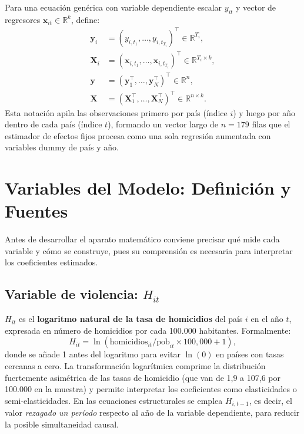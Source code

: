 \documentclass[12pt, a4paper]{article}
\theoremstyle{definition}
\newcommand{\R}{\mathbb{R}}
\begin{document}
Para una ecuación genérica con variable dependiente escalar $y_{it}$ y vector de regresores $\bm{x}_{it} \in \R^k$, define:
\begin{align*}
  \bm{y}_i &= (y_{i,t_1}, \ldots, y_{i,t_{T_i}})^\top \in \R^{T_i}, \\
  \bm{X}_i &= (\bm{x}_{i,t_1}, \ldots, \bm{x}_{i,t_{T_i}})^\top \in \R^{T_i \times k}, \\
  \bm{y}   &= (\bm{y}_1^\top, \ldots, \bm{y}_N^\top)^\top \in \R^n, \\
  \bm{X}   &= (\bm{X}_1^\top, \ldots, \bm{X}_N^\top)^\top \in \R^{n \times k}.
\end{align*}
Esta notación apila las observaciones primero por país (índice $i$) y luego por año dentro de cada país (índice $t$), formando un vector largo de $n = 179$ filas que el estimador de efectos fijos procesa como una sola regresión aumentada con variables dummy de país y año.

\section{Variables del Modelo: Definición y Fuentes}
\label{sec:variables}

Antes de desarrollar el aparato matemático conviene precisar qué mide cada variable y cómo se construye, pues su comprensión es necesaria para interpretar los coeficientes estimados.

\subsection{Variable de violencia: $H_{it}$}

$H_{it}$ es el \textbf{logaritmo natural de la tasa de homicidios} del país $i$ en el año $t$, expresada en número de homicidios por cada 100.000 habitantes. Formalmente:
\[
  H_{it} = \ln\!\left(\text{homicidios}_{it} / \text{pob}_{it} \times 100{,}000 + 1\right),
\]
donde se añade 1 antes del logaritmo para evitar $\ln(0)$ en países con tasas cercanas a cero. La transformación logarítmica comprime la distribución fuertemente asimétrica de las tasas de homicidio (que van de 1,9 a 107,6 por 100.000 en la muestra) y permite interpretar los coeficientes como elasticidades o semi-elasticidades. En las ecuaciones estructurales se emplea $H_{i,t-1}$, es decir, el valor \emph{rezagado un período} respecto al año de la variable dependiente, para reducir la posible simultaneidad causal.
\end{document}
